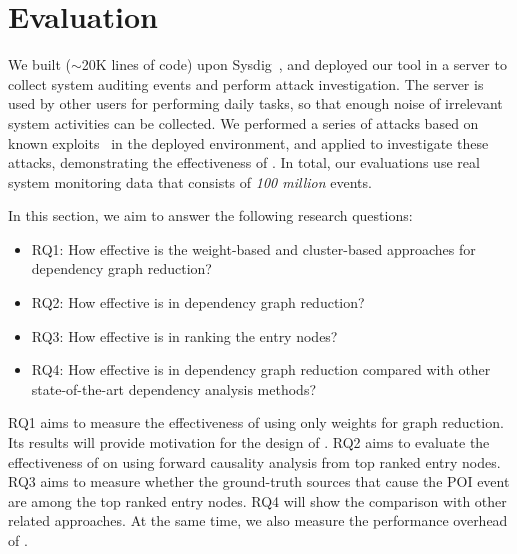 \section{Evaluation}


We built \tool ($\sim$20K lines of code) upon Sysdig~\cite{sysdig}, and deployed our tool in a server to collect system auditing events and perform attack investigation. 
The server is used by other users for performing daily tasks, so that enough noise of irrelevant system activities can be collected.
We performed a series of attacks based on known exploits~\cite{exploitdb,liu2018priotracker,kwon2018mci,reduction} in the deployed environment,
and applied \tool to
investigate these attacks, demonstrating the effectiveness of \tool.
In total, our evaluations use real system monitoring data that consists of \emph{100 million} events. 

In this section, we aim to answer the following research questions:

\begin{itemize}[noitemsep, topsep=1pt, partopsep=1pt, listparindent=\parindent, leftmargin=*]
\item RQ1: How effective is the weight-based and cluster-based approaches for dependency graph reduction?
\item RQ2: How effective is \tool in dependency graph reduction?
\item RQ3: How effective is \tool in ranking the entry nodes?
\item RQ4: How effective is \tool in dependency graph reduction compared with other state-of-the-art dependency analysis methods?
\end{itemize}
RQ1 aims to measure the effectiveness of using only weights for graph reduction.
Its results will provide motivation for the design of \tool.
RQ2 aims to evaluate the effectiveness of \tool on using forward causality analysis from top ranked entry nodes.
RQ3 aims to measure whether the ground-truth sources that cause the POI event are among the top ranked entry nodes.
RQ4 will show the comparison with other related approaches. At the same time, we also measure the performance overhead of \tool.




